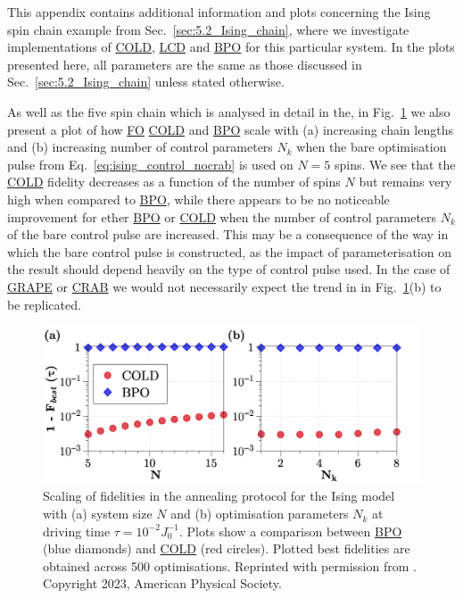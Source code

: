 \documentclass[a4paper,oneside,11pt]{book}
\newcommand{\acrref}[1]{\hyperref[acr:#1]{#1}}
\begin{document}
This appendix contains additional information and plots concerning the Ising spin chain example from Sec.~\ref{sec:5.2_Ising_chain}, where we investigate implementations of \acrref{COLD}, \acrref{LCD} and \acrref{BPO} for this particular system. In the plots presented here, all parameters are the same as those discussed in Sec.~\ref{sec:5.2_Ising_chain} unless stated otherwise.

As well as the five spin chain which is analysed in detail in the, in Fig.~\ref{fig:ising_scalingN} we also present a plot of how \acrref{FO} \acrref{COLD} and \acrref{BPO} scale with (a) increasing chain lengths and (b) increasing number of control parameters $N_k$ when the bare optimisation pulse from Eq.~\eqref{eq:ising_control_nocrab} is used on $N=5$ spins. We see that the \acrref{COLD} fidelity decreases as a function of the number of spins $N$ but remains very high when compared to \acrref{BPO}, while there appears to be no noticeable improvement for ether \acrref{BPO} or \acrref{COLD} when the number of control parameters $N_k$ of the bare control pulse are increased. This may be a consequence of the way in which the bare control pulse is constructed, as the impact of parameterisation on the result should depend heavily on the type of control pulse used. In the case of \acrref{GRAPE} or \acrref{CRAB} we would not necessarily expect the trend in in Fig.~\ref{fig:ising_scalingN}(b) to be replicated.

\begin{figure}[t!]
    \centering
    \includegraphics[width=\linewidth]{images/ScalingN.png} \caption[Plots of how final state fidelities scale using COLD and BPO for different system sizes and optimisable parameters.]{Scaling of fidelities in the annealing protocol for the Ising model with (a) system size $N$ and (b) optimisation parameters $N_k$ at driving time $\tau=10^{-2}J_0^{-1}$. Plots show a comparison between \acrref{BPO} (blue diamonds) and \acrref{COLD} (red circles). Plotted best fidelities are obtained across 500 optimisations. Reprinted with permission from \cite{cepaite_counterdiabatic_2023}. Copyright 2023, American Physical Society.}\label{fig:ising_scalingN}
\end{figure}
\end{document}
